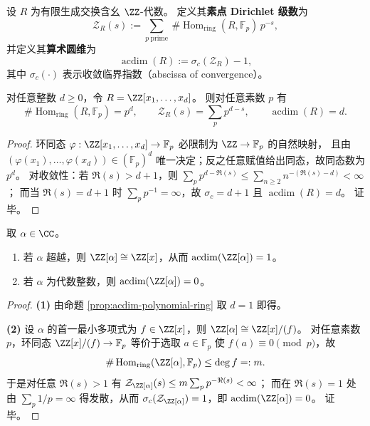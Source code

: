 \begin{definition}\label{def:acdim-prime-point-dirichlet}
设 \(R\) 为有限生成交换含幺 \(\ZZ\)-代数。
定义其\textbf{素点 Dirichlet 级数}为
\[
\mathcal Z_R(s):=\sum_{p\ \mathrm{prime}}\ \#\operatorname{Hom}_{\mathrm{ring}}(R,\mathbb F_p)\,p^{-s},
\]
并定义其\textbf{算术圆维}为
\[
\operatorname{acdim}(R):=\sigma_c(\mathcal Z_R)-1,
\]
其中 \(\sigma_c(\cdot)\) 表示收敛临界指数（abscissa of convergence）。
\end{definition}

\begin{proposition}[多项式环的算术圆维]\label{prop:acdim-polynomial-ring}
对任意整数 \(d\ge 0\)，令 \(R=\ZZ[x_1,\dots,x_d]\)。
则对任意素数 \(p\) 有
\[
\#\operatorname{Hom}_{\mathrm{ring}}(R,\mathbb F_p)=p^{d},
\qquad
\mathcal Z_R(s)=\sum_{p}p^{d-s},
\qquad
\operatorname{acdim}(R)=d.
\]
\end{proposition}
\begin{proof}
环同态 \(\varphi:\ZZ[x_1,\dots,x_d]\to\mathbb F_p\) 必限制为 \(\ZZ\to\mathbb F_p\) 的自然映射，
且由 \((\varphi(x_1),\dots,\varphi(x_d))\in(\mathbb F_p)^d\) 唯一决定；反之任意赋值给出同态，故同态数为 \(p^d\)。
对收敛性：若 \(\Re(s)>d+1\)，则 \(\sum_p p^{d-\Re(s)}\le \sum_{n\ge 2} n^{-(\Re(s)-d)}<\infty\)；
而当 \(\Re(s)=d+1\) 时 \(\sum_p p^{-1}=\infty\)，故 \(\sigma_c=d+1\) 且 \(\operatorname{acdim}(R)=d\)。
证毕。
\end{proof}

\begin{corollary}[代数整数与超越元的算术圆维分离]\label{cor:acdim-algebraic-vs-transcend}
取 \(\alpha\in\CC\)。
\begin{enumerate}
  \item 若 \(\alpha\) 超越，则 \(\ZZ[\alpha]\cong\ZZ[x]\)，从而 \(\operatorname{acdim}(\ZZ[\alpha])=1\)。
  \item 若 \(\alpha\) 为代数整数，则 \(\operatorname{acdim}(\ZZ[\alpha])=0\)。
\end{enumerate}
\end{corollary}
\begin{proof}
\textbf{(1)} 由命题 \ref{prop:acdim-polynomial-ring} 取 \(d=1\) 即得。
\par
\textbf{(2)} 设 \(\alpha\) 的首一最小多项式为 \(f\in\ZZ[x]\)，则 \(\ZZ[\alpha]\cong\ZZ[x]/(f)\)。
对任意素数 \(p\)，环同态 \(\ZZ[x]/(f)\to\mathbb F_p\) 等价于选取 \(a\in\mathbb F_p\) 使 \(f(a)\equiv 0\pmod p\)，故
\[
\#\operatorname{Hom}_{\mathrm{ring}}(\ZZ[\alpha],\mathbb F_p)\le \deg f=:m.
\]
于是对任意 \(\Re(s)>1\) 有
\(
\mathcal Z_{\ZZ[\alpha]}(s)\le m\sum_p p^{-\Re(s)}<\infty
\)；
而在 \(\Re(s)=1\) 处由 \(\sum_p 1/p=\infty\) 得发散，从而 \(\sigma_c(\mathcal Z_{\ZZ[\alpha]})=1\)，即 \(\operatorname{acdim}(\ZZ[\alpha])=0\)。
证毕。
\end{proof}

